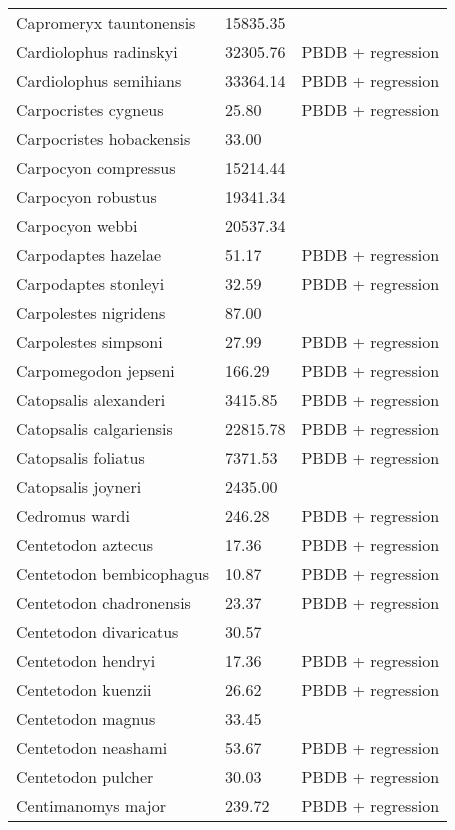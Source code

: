 \begin{center}
\begin{longtable}{p{} p{} p{} }
  Capromeryx tauntonensis & 15835.35 & \cite{Tomiya2013} \\ 
  Cardiolophus radinskyi & 32305.76 & PBDB + regression \\ 
  Cardiolophus semihians & 33364.14 & PBDB + regression \\ 
  Carpocristes cygneus & 25.80 & PBDB + regression \\ 
  Carpocristes hobackensis & 33.00 & \cite{Soligo2006} \\ 
  Carpocyon compressus & 15214.44 & \cite{Tomiya2013} \\ 
  Carpocyon robustus & 19341.34 & \cite{Tomiya2013} \\ 
  Carpocyon webbi & 20537.34 & \cite{Tomiya2013} \\ 
  Carpodaptes hazelae & 51.17 & PBDB + regression \\ 
  Carpodaptes stonleyi & 32.59 & PBDB + regression \\ 
  Carpolestes nigridens & 87.00 & \cite{Scott2003a} \\ 
  Carpolestes simpsoni & 27.99 & PBDB + regression \\ 
  Carpomegodon jepseni & 166.29 & PBDB + regression \\ 
  Catopsalis alexanderi & 3415.85 & PBDB + regression \\ 
  Catopsalis calgariensis & 22815.78 & PBDB + regression \\ 
  Catopsalis foliatus & 7371.53 & PBDB + regression \\ 
  Catopsalis joyneri & 2435.00 & \cite{Wilson2012} \\ 
  Cedromus wardi & 246.28 & PBDB + regression \\ 
  Centetodon aztecus & 17.36 & PBDB + regression \\ 
  Centetodon bembicophagus & 10.87 & PBDB + regression \\ 
  Centetodon chadronensis & 23.37 & PBDB + regression \\ 
  Centetodon divaricatus & 30.57 & \cite{Tomiya2013} \\ 
  Centetodon hendryi & 17.36 & PBDB + regression \\ 
  Centetodon kuenzii & 26.62 & PBDB + regression \\ 
  Centetodon magnus & 33.45 & \cite{Tomiya2013} \\ 
  Centetodon neashami & 53.67 & PBDB + regression \\ 
  Centetodon pulcher & 30.03 & PBDB + regression \\ 
  Centimanomys major & 239.72 & PBDB + regression \\ 

\end{longtable}
\end{center}
